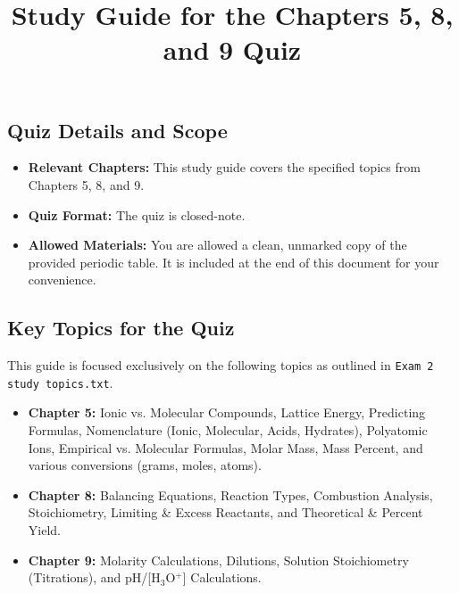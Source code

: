 \documentclass{article}
\title{Study Guide for the Chapters 5, 8, and 9 Quiz}
\author{}
\date{}
\begin{document}
\maketitle %

\subsection*{Quiz Details and Scope}
\begin{itemize}[itemsep=5pt]
    \item \textbf{Relevant Chapters:} This study guide covers the specified topics from Chapters 5, 8, and 9.
    \item \textbf{Quiz Format:} The quiz is closed-note.
    \item \textbf{Allowed Materials:} You are allowed a clean, unmarked copy of the provided periodic table. It is included at the end of this document for your convenience.
\end{itemize}

\subsection*{Key Topics for the Quiz}
This guide is focused exclusively on the following topics as outlined in \texttt{Exam 2 study topics.txt}.
\begin{itemize}[itemsep=5pt]
    \item \textbf{Chapter 5:} Ionic vs. Molecular Compounds, Lattice Energy, Predicting Formulas, Nomenclature (Ionic, Molecular, Acids, Hydrates), Polyatomic Ions, Empirical vs. Molecular Formulas, Molar Mass, Mass Percent, and various conversions (grams, moles, atoms).
    \item \textbf{Chapter 8:} Balancing Equations, Reaction Types, Combustion Analysis, Stoichiometry, Limiting \& Excess Reactants, and Theoretical \& Percent Yield.
    \item \textbf{Chapter 9:} Molarity Calculations, Dilutions, Solution Stoichiometry (Titrations), and pH/[H\(_3\)O\(^+\)] Calculations.
\end{itemize}

\bigskip
\end{document}
